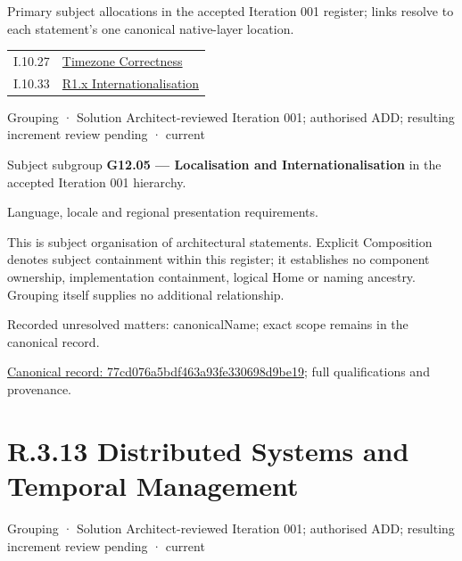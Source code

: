 Primary subject allocations in the accepted Iteration 001 register; links resolve to each statement’s one canonical native-layer location.\par
\begin{longtable}{p{.22\linewidth}p{.73\linewidth}}
I.10.27 & \hyperref[element:3da1fba95a00438db09c342dfba8b693]{Timezone Correctness} \\
I.10.33 & \hyperref[element:920606fdc7c14a27b7e39a08105c77b6]{R1.x Internationalisation} \\
\end{longtable}
\label{element:77cd076a5bdf463a93fe330698d9be19}
{\small Grouping · Solution Architect-reviewed Iteration 001; authorised ADD; resulting increment review pending · current}\par

Subject subgroup \textbf{G12.05 — Localisation and Internationalisation} in the accepted Iteration 001 hierarchy.



Language, locale and regional presentation requirements.



This is subject organisation of architectural statements. Explicit Composition denotes subject containment within this register; it establishes no component ownership, implementation containment, logical Home or naming ancestry. Grouping itself supplies no additional relationship.


{\small Recorded unresolved matters: canonicalName; exact scope remains in the canonical record.}\par
{\footnotesize \href{../../../../continuum/grouping/77cd076a5bdf463a93fe330698d9be19.md}{Canonical record: 77cd076a5bdf463a93fe330698d9be19}; full qualifications and provenance.}\par
\section*{R.3.13 Distributed Systems and Temporal Management}
\label{navigation:R.3.13}

\label{element:c77bba93c0c843959b30d9e1195fb68e}
{\small Grouping · Solution Architect-reviewed Iteration 001; authorised ADD; resulting increment review pending · current}\par

